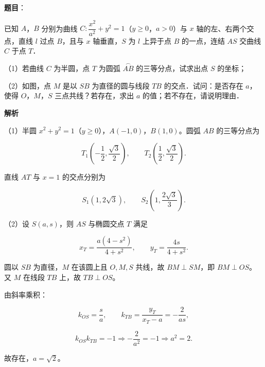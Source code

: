 \begin{answer}

\textbf{题目}：

已知 $A$，$B$ 分别为曲线 $C:\dfrac{x^2}{a^2}+y^2=1$（$y\geqslant0$，$a>0$）与 $x$ 轴的左、右两个交点，直线 $l$ 过点 $B$，且与 $x$ 轴垂直，$S$ 为 $l$ 上异于点 $B$ 的一点，连结 $AS$ 交曲线 $C$ 于点 $T$．

（1）若曲线 $C$ 为半圆，点 $T$ 为圆弧 $\overset{\frown}{AB}$ 的三等分点，试求出点 $S$ 的坐标；

（2）如图，点 $M$ 是以 $SB$ 为直径的圆与线段 $TB$ 的交点．试问：是否存在 $a$，使得 $O$，$M$，$S$ 三点共线？若存在，求出 $a$ 的值；若不存在，请说明理由．
\nopagebreak[4]
\begin{center}\end{center}
\nopagebreak[4]
\textbf{解析}

（1）半圆 $x^2+y^2=1$（$y\geqslant0$），$A(-1,0)$，$B(1,0)$。圆弧 $AB$ 的三等分点为

\nopagebreak[4]
\[T_1\left(-\frac12,\frac{\sqrt3}2\right),\qquad T_2\left(\frac12,\frac{\sqrt3}2\right).\]

直线 $AT$ 与 $x=1$ 的交点分别为

\nopagebreak[4]
\[S_1(1,2\sqrt3),\qquad S_2\left(1,\frac{2\sqrt3}3\right).\]

（2）设 $S(a,s)$，则 $AS$ 与椭圆交点 $T$ 满足

\nopagebreak[4]
\[x_T=\frac{a(4-s^2)}{4+s^2},\qquad y_T=\frac{4s}{4+s^2}.\]

圆以 $SB$ 为直径，$M$ 在该圆上且 $O,M,S$ 共线，故 $BM\perp SM$，即 $BM\perp OS$。又 $M$ 在线段 $TB$ 上，故 $TB\perp OS$。

由斜率乘积：

\nopagebreak[4]
\[k_{OS}=\frac sa,\qquad k_{TB}=\frac{y_T}{x_T-a}=-\frac2{as},\]

\nopagebreak[4]
\[k_{OS}k_{TB}=-1\Longrightarrow -\frac2{a^2}=-1\Longrightarrow a^2=2.\]

故存在，$a=\sqrt2$。


\end{answer}
